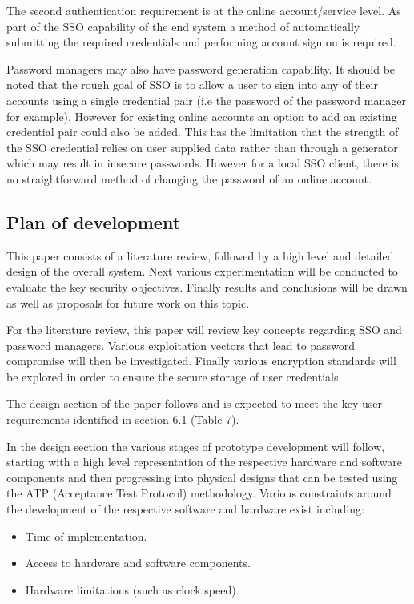The second authentication requirement is at the online account/service level. As part of the SSO capability of the end system a method of automatically submitting the required credentials and performing account sign on is required. 

Password managers may also have password generation capability. It should be noted that the rough goal of SSO is to allow a user to sign into any of their accounts using a single credential pair (i.e the password of the password manager for example). However for existing online accounts an option to add an existing credential pair could also be added. This has the limitation that the strength of the SSO credential relies on user supplied data rather than through a generator which may result in insecure passwords. However for a local SSO client, there is no straightforward method of changing the password of an online account. 



\subsection{Plan of development}

This paper consists of a literature review, followed by a high level and detailed design of the overall system. Next various experimentation will be conducted to evaluate the key security objectives. Finally results and conclusions will be drawn as well as proposals for future work on this topic.

For the literature review, this paper will review key concepts regarding SSO and password managers. Various exploitation vectors that lead to password compromise will then be investigated. Finally various encryption standards will be explored in order to ensure the secure storage of user credentials.

The design section of the paper follows and is expected to meet the key user requirements identified in section 6.1 (Table 7).
  
  
In the design section the various stages of prototype development will follow, starting with a high level representation of the respective hardware and software components and then progressing into physical designs that can be tested using the ATP (Acceptance Test Protocol) methodology. Various constraints around the development of the respective software and hardware exist including:

\begin{itemize}
  \item Time of implementation.
  \item Access to hardware and software components.
  \item Hardware limitations (such as clock speed).
  \end{itemize}
  
